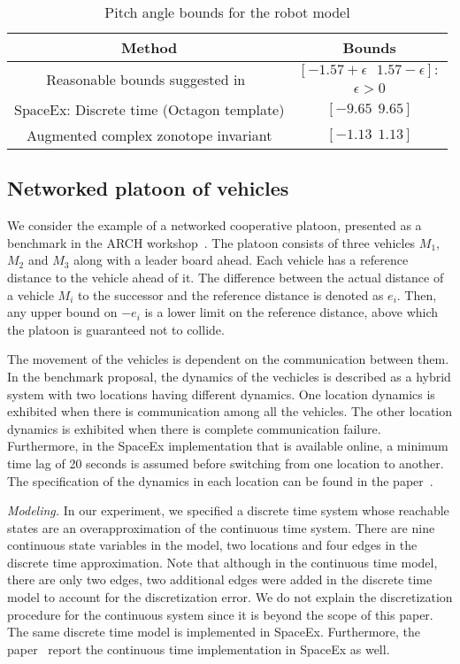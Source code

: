 \begin{table}
\caption{Pitch angle bounds for the robot model}
\centering
\begin{tabular}{|c|c|}
\hline
Method & Bounds\\
\hline
\multirow{2}{9.8em}{Reasonable bounds suggested in~\cite{TODO}} &
$[-1.57+\epsilon~~~1.57-\epsilon]:$\\
& $\epsilon>0$\\
\hline
\multirow{2}{9.8em}{SpaceEx: Discrete time (Octagon template)} &
\multirow{2}{*}{$[-9.65~~9.65]$}\\
& \\
\hline
\multirow{2}{9.8em}{Augmented complex zonotope invariant}
&  \multirow{2}{*}{$[-1.13~~1.13]$}\\
& \\
\hline
\end{tabular}
\end{table}


\subsection{Networked platoon of vehicles}
We consider the example of a networked cooperative platoon, presented
as a benchmark in the ARCH workshop~\cite{TODO}.  The platoon consists
of three vehicles $M_1$, $M_2$ and $M_3$ along with a leader board
ahead.  Each vehicle has a reference distance to the vehicle ahead of
it.  The difference between the actual distance of a vehicle $M_i$ to
the successor and the reference distance is denoted as $e_i$.  Then,
any upper bound on $-e_i$ is a lower limit on the reference
distance, above which the platoon is guaranteed not to collide.

The movement of the vehicles is dependent on the communication between
them.  In the benchmark proposal, the dynamics of the vechicles is
described as a hybrid system with two locations having different
dynamics.  One location dynamics is exhibited when there is
communication among all the vehicles.  The other location dynamics is
exhibited when there is complete communication failure.  Furthermore,
in the SpaceEx implementation that is available online, a minimum time
lag of 20 seconds is assumed before switching from one location to
another.  The specification of the dynamics in each location can be
found in the paper~\cite{TODO}.

\emph{Modeling.}  In our experiment, we specified a discrete time
system whose reachable states are an overapproximation of the
continuous time system.  There are nine continuous state variables in
the model, two locations and four edges in the discrete time
approximation.  Note that although in the continuous time model, there
are only two edges, two additional edges were added in the discrete
time model to account for the discretization error.  We do not explain
the discretization procedure for the continuous system since it is
beyond the scope of this paper.  The same discrete time model is
implemented in SpaceEx.  Furthermore, the paper~\cite{TODO} report the
continuous time implementation in SpaceEx as well.


